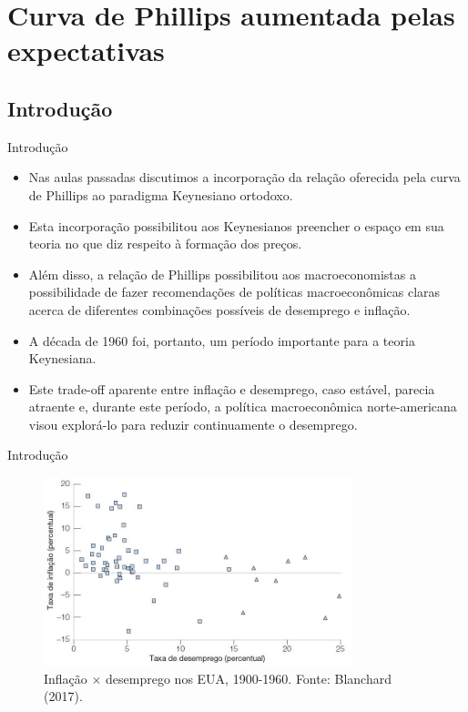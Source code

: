 \documentclass[10pt]{beamer}
\begin{document}
\section{Curva de Phillips aumentada pelas expectativas}
\subsection{Introdução}
\begin{frame}{Introdução}
    \begin{itemize}
        \item Nas aulas passadas discutimos a incorporação da relação oferecida pela curva de Phillips ao paradigma Keynesiano ortodoxo.
        \bigskip
        \item Esta incorporação possibilitou aos Keynesianos preencher o espaço em sua teoria no que diz respeito à formação dos preços.
        \bigskip
        \item Além disso, a relação de Phillips possibilitou aos macroeconomistas a possibilidade de fazer recomendações de políticas macroeconômicas claras acerca de diferentes combinações possíveis de desemprego e inflação.
        \bigskip
        \item A década de 1960 foi, portanto, um período importante para a teoria Keynesiana.
        \bigskip
        \item Este trade-off aparente entre inflação e desemprego, caso estável, parecia atraente e, durante este período, a política macroeconômica norte-americana visou explorá-lo para reduzir continuamente o desemprego.
    \end{itemize}
\end{frame}

\begin{frame}{Introdução}
    \begin{figure}
        \centering
        \includegraphics[width=0.8\textwidth]{./figures/aula10_fig8.JPG}
        \caption{Inflação $\times$ desemprego nos EUA, 1900-1960. Fonte: Blanchard (2017).}
        \label{fig75}
    \end{figure}
\end{frame}
\end{document}
